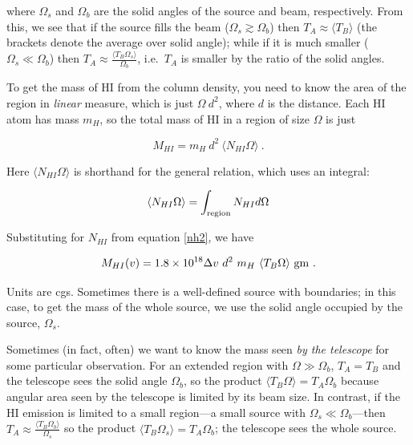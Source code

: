 \documentclass[psfig,preprint]{aastex}
\begin{document}
\noindent where $\Omega_s$ and $\Omega_b$ are the solid angles of the
source and beam, respectively. From this, we see that if the source
fills the beam ($\Omega_s \gtrsim \Omega_b$) then $T_A \approx \langle
T_B\rangle$ (the brackets denote the average over solid angle);
while if it is much smaller ($\Omega_s \ll \Omega_b$) then $T_A \approx
\frac{\langle T_B \Omega_s\rangle}{\Omega_b}$, i.e.\ $T_A$ is smaller by the ratio of
the solid angles. 

	To get the mass of HI from the column density, you need to know
the area of the region in {\it linear} measure, which is just $\Omega \
d^2$, where $d$ is the distance.  Each HI atom has mass $m_H$, so the
total mass of HI in a region of size $\Omega$ is just

\begin{mathletters} \label{masseqn}
\begin{equation} 
M_{HI} = m_H \ d^2 \ \langle N_{HI} \Omega\rangle \ .
\end{equation}

\noindent Here $\langle N_{HI} \Omega \rangle$ is shorthand for the
general relation, which uses an integral:

\begin{equation}
\langle N_{HI} \Omega \rangle = \int_{\rm region} N_{HI} d \Omega
\end{equation}
\end{mathletters}

\noindent Substituting for $N_{HI}$ from equation \ref{nh2}, we have

\begin{equation}  \label{telemass}
M_{HI}(v) = 1.8 \times 10^{18} \Delta v \ d^2 \  m_H \ \langle T_B  \Omega\rangle \ {\rm
gm} \ . 
\end{equation}

\noindent Units are cgs. Sometimes there is a well-defined source with
boundaries; in this case, to get the mass of the whole source, we use
the solid angle occupied by the source, $\Omega_s$.

	Sometimes (in fact, often) we want to know the mass seen {\it by
the telescope} for some particular observation.  For an extended region
with $\Omega \gg \Omega_b$, $T_A = T_B$ and the telescope sees the solid
angle $\Omega_b$, so the product $\langle T_B \Omega\rangle = T_A
\Omega_b$ because angular area seen by the telescope is limited by its
beam size.  In contrast, if the HI emission is limited to a small
region---a small source with $\Omega_s \ll \Omega_b$---then $T_A \approx
\frac{\langle T_B \Omega_b\rangle}{\Omega_s}$ so the product $\langle
T_B \Omega_s\rangle = T_A \Omega_b$; the telescope sees the whole
source.  
\end{document}
